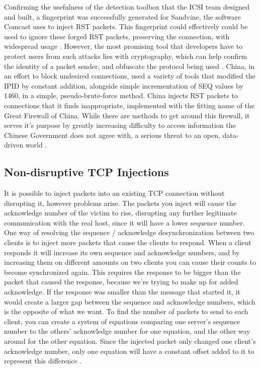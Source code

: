 \documentclass[journal]{IEEEtran}
\begin{document}
Confirming the usefulness of the detection toolbox that the ICSI team designed and built, a fingerprint was successfully generated for Sandvine, the software Comcast uses to inject RST packets. This fingerprint could effectively could be used to ignore these forged RST packets, preserving the connection, with widespread usage \cite{rstdetection}. However, the most promising tool that developers have to protect users from such attacks lies with cryptography, which can help confirm the identity of a packet sender, and obfuscate the protocol being used \cite{comcasteff}. 
China, in an effort to block undesired connections, used a variety of tools that modified the IPID by constant addition, alongside simple incrementation of SEQ values by 1460, in a simple, pseudo-brute-force method. China injects RST packets to connections that it finds inappropriate, implemented with the fitting name of the Great Firewall of China. While there are methods to get around this firewall, it serves it's purpose by greatly  increasing difficulty to access information the Chinese Government does not agree with, a serious threat to an open, data-driven world \cite{rstdetection}. 

\subsection{Non-disruptive TCP Injections}

It is possible to inject packets into an existing TCP connection without disrupting it, however problems arise. The packets you inject will cause the acknowledge number of the victim to rise, disrupting any further legitimate communication with the real host, since it will have a lower sequence number. One way of resolving the sequence / acknowledge desynchronization between two clients is to inject more packets that cause the clients to respond. When a client responds it will increase its own sequence and acknowledge numbers, and by increasing them on different amounts on two clients you can cause their counts to become synchronized again. This requires the response to be bigger than the packet that caused the response, because we're trying to make up for added acknowledge. If the response was smaller than the message that started it, it would create a larger gap between the sequence and acknowledge numbers, which is the opposite of what we want. To find the number of packets to send to each client, you can create a system of equations comparing one server's sequence number to the others' acknowledge number for one equation, and the other way around for the other equation. Since the injected packet only changed one client's acknowledge number, only one equation will have a constant offset added to it to represent this difference \cite{tcphij}.
\end{document}
